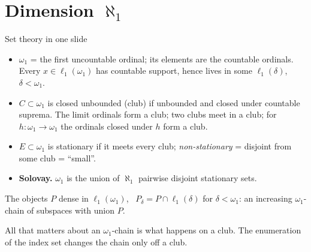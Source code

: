 \documentclass[10pt,aspectratio=169]{beamer}
\newcommand{\ellone}[1]{\ell_1(#1)}
\begin{document}
\section{Dimension $\aleph_1$}

\begin{frame}{Set theory in one slide}
  \begin{itemize}
    \item $\omega_1$ = the first uncountable ordinal; its elements are the
      countable ordinals. Every $x\in\ellone{\omega_1}$ has countable support,
      hence lives in some $\ellone\delta$, $\delta<\omega_1$.
    \item $C\subset\omega_1$ is \alert{closed unbounded} (club) if unbounded and
      closed under countable suprema. The limit ordinals form a club; two clubs
      meet in a club; for $h\colon\omega_1\to\omega_1$ the ordinals closed under
      $h$ form a club.
    \item $E\subset\omega_1$ is \alert{stationary} if it meets every club;
      \emph{non-stationary} = disjoint from some club = ``small''.
    \item \textbf{Solovay.} $\omega_1$ is the union of $\aleph_1$ pairwise disjoint
      stationary sets.
  \end{itemize}
  \medskip
  \begin{block}{The objects}
    $P$ dense in $\ellone{\omega_1}$, \ $P_\delta=P\cap\ellone\delta$ for
    $\delta<\omega_1$: an increasing $\omega_1$-chain of subspaces with union $P$.
  \end{block}
  All that matters about an $\omega_1$-chain is what happens on a club. The
  enumeration of the index set changes the chain only off a club.
\end{frame}
\end{document}
